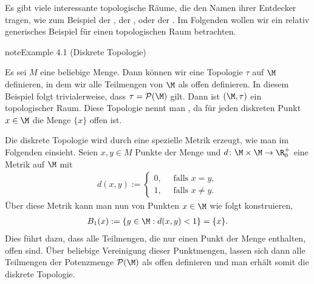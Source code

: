 \documentclass[letterpaper,10pt,english]{jupyterBook}
\begin{document}
\sphinxAtStartPar
Es gibt viele interessante topologische Räume, die den Namen ihrer Entdecker tragen, wie zum Beispiel der , der , oder der .
Im Folgenden wollen wir ein relativ generisches Beispiel für einen topologischen Raum betrachten.
\label{manifolds/manifolds_prelim:ex:diskreteTopologie}
\begin{sphinxadmonition}{note}{Example 4.1 (Diskrete Topologie)}



\sphinxAtStartPar
Es sei \(M\) eine beliebige Menge.
Dann können wir eine Topologie \(\tau\) auf \(\M\) definieren, in dem wir alle Teilmengen von \(\M\) als offen definieren.
In diesem Beispiel folgt trivialerweise, dass \(\tau = \mathcal{P}(\M)\) gilt.
Dann ist \((\M, \tau)\) ein topologischer Raum.
Diese Topologie nennt man , da für jeden diskreten Punkt \(x \in \M\) die Menge \(\lbrace x \rbrace\) offen ist.

\sphinxAtStartPar
Die diskrete Topologie wird durch eine spezielle Metrik erzeugt, wie man im Folgenden einsieht.
Seien \(x,y \in M\) Punkte der Menge und \(d \colon \M \times \M \rightarrow \R^+_0\) eine Metrik auf \(\M\) mit
\begin{equation*}
\begin{split}d(x,y) := \begin{cases} 0, \quad \text{ falls } x=y,\\ 1, \quad \text{ falls } x\neq y. \end{cases}\end{split}
\end{equation*}
\sphinxAtStartPar
Über diese Metrik kann man nun  von Punkten \(x \in \M\) wie folgt konstruieren,
\begin{equation*}
\begin{split}B_1(x) := \lbrace y \in \M : d(x,y) < 1 \rbrace = \lbrace x \rbrace.\end{split}
\end{equation*}
\sphinxAtStartPar
Dies führt dazu, dass alle Teilmengen, die nur einen Punkt der Menge enthalten, offen sind.
Über beliebige Vereinigung dieser Punktmengen, lassen sich dann alle Teilmengen der Potenzmenge \(\mathcal{P}(\M)\) als offen definieren und man erhält somit die diskrete Topologie.
\end{sphinxadmonition}
\end{document}
